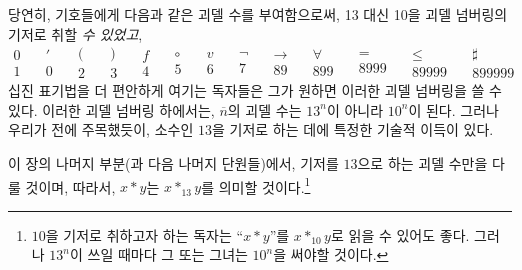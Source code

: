 \documentclass[12pt]{paper}
\begin{document}
당연히, 기호들에게 다음과 같은 괴델 수를 부여함으로써, 13 대신 10을 괴델 넘버링의 기저로 취할 \textit{수 있었고},
$$ \begin{matrix}
0 \\
1
\end{matrix} \quad
\begin{matrix}
' \\
0
\end{matrix} \quad
\begin{matrix}
( \\
2
\end{matrix} \quad
\begin{matrix}
) \\
3
\end{matrix} \quad
\begin{matrix}
f \\
4
\end{matrix} \quad
\begin{matrix}
\circ \\
5
\end{matrix} \quad
\begin{matrix}
v \\
6  
\end{matrix} \quad
\begin{matrix}
\lnot \\
7
\end{matrix} \quad
\begin{matrix}
\rightarrow \\
89
\end{matrix} \quad
\begin{matrix}
\forall \\
899
\end{matrix} \quad
\begin{matrix}
= \\
8999
\end{matrix} \quad
\begin{matrix}
\leq \\
89999
\end{matrix} \quad
\begin{matrix}
\sharp \\
899999
\end{matrix} $$
십진 표기법을 더 편안하게 여기는 독자들은 그가 원하면 이러한 괴델 넘버링을 쓸 수 있다.
이러한 괴델 넘버링 하에서는, $\overline{n}$의 괴델 수는 $13^{n}$이 아니라 $10^{n}$이 된다.
그러나 우리가 전에 주목했듯이, 소수인 $13$을 기저로 하는 데에 특정한 기술적 이득이 있다.

이 장의 나머지 부분(과 다음 나머지 단원들)에서,
기저를 $13$으로 하는 괴델 수만을 다룰 것이며,
따라서, $x * y$는 $x *_{13} y$를 의미할 것이다.\footnote
{
$10$을 기저로 취하고자 하는 독자는 ``$x * y$''를 $x *_{10} y$로 읽을 수 있어도 좋다.
그러나 $13^{n}$이 쓰일 때마다 그 또는 그녀는 $10^{n}$을 써야할 것이다.
}
\end{document}
